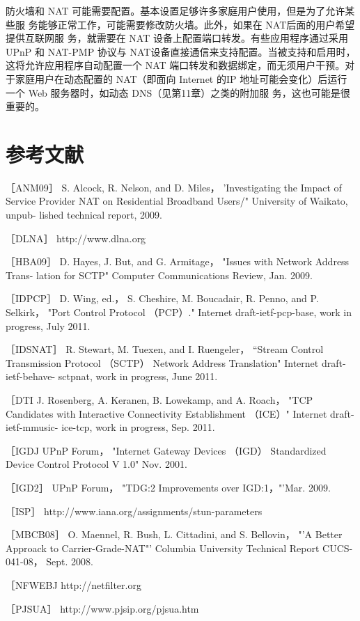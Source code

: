防火墙和 NAT 可能需要配置。基本设置足够许多家庭用户使用，但是为了允许某些服
务能够正常工作，可能需要修改防火墙。此外，如果在 NAT后面的用户希望提供互联网服
务，就需要在 NAT 设备上配置端口转发。有些应用程序通过采用 UPnP 和 NAT-PMP 协议与
NAT设备直接通信来支持配置。当被支持和启用时，这将允许应用程序自动配置一个 NAT
端口转发和数据绑定，而无须用户干预。对于家庭用户在动态配置的 NAT（即面向 Internet
的IP 地址可能会变化）后运行一个 Web 服务器时，如动态 DNS（见第11章）之类的附加服
务，这也可能是很重要的。

\section{参考文献}

［ANM09］ S. Alcock, R. Nelson, and D. Miles， 'Investigating the Impact of Service
Provider NAT on Residential Broadband Users/" University of Waikato, unpub-
lished technical report, 2009.

［DLNA］ http://www.dlna.org

［HBA09］ D. Hayes, J. But, and G. Armitage， "Issues with Network Address Trans-
lation for SCTP" Computer Communications Review, Jan. 2009.

［IDPCP］ D. Wing, ed.， S. Cheshire, M. Boucadair, R. Penno, and P. Selkirk， "Port
Control Protocol （PCP）." Internet draft-ietf-pcp-base, work in progress, July 2011.

［IDSNAT］ R. Stewart, M. Tuexen, and I. Ruengeler， “Stream Control Transmission
Protocol （SCTP） Network Address Translation" Internet draft-ietf-behave-
sctpnat, work in progress, June 2011.

［DTI J. Rosenberg, A. Keranen, B. Lowekamp, and A. Roach， "TCP Candidates
with Interactive Connectivity Establishment （ICE）" Internet draft-ietf-mmusic-
ice-tcp, work in progress, Sep. 2011.

［IGDJ UPnP Forum， "Internet Gateway Devices （IGD） Standardized Device
Control Protocol V 1.0" Nov. 2001.

［IGD2］ UPnP Forum， "TDG:2 Improvements over IGD:1，"'Mar. 2009.

［ISP］ http://www.iana.org/assignments/stun-parameters

［MBCB08］ O. Maennel, R. Bush, L. Cittadini, and S. Bellovin， "'A Better Approack
to Carrier-Grade-NAT"' Columbia University Technical Report CUCS-041-08，
Sept. 2008.

［NFWEBJ http://netfilter.org

［PJSUA］ http://www.pjsip.org/pjsua.htm

